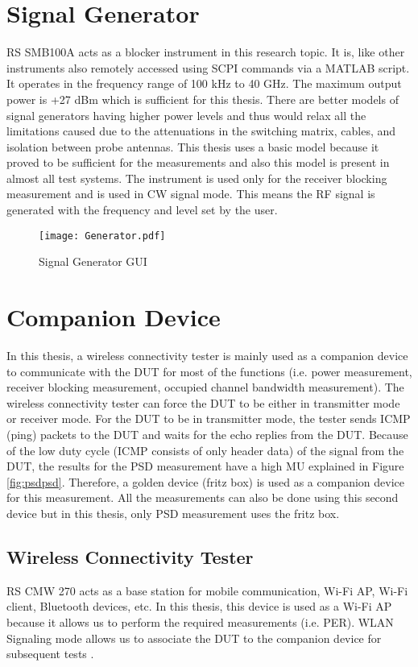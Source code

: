 \section{Signal Generator}
\acs{RS}\textregistered{} SMB100A acts as a blocker instrument in this research topic. It is, like other instruments also remotely accessed using \acs{SCPI} commands via a MATLAB\textregistered{} script. It operates in the frequency range of 100 kHz to 40 GHz. The maximum output power is +27 dBm which is sufficient for this thesis. There are better models of signal generators having higher power levels and thus would relax all the limitations caused due to the attenuations in the switching matrix, cables, and isolation between probe antennas. This thesis uses a basic model because it proved to be sufficient for the measurements and also this model is present in almost all test systems. The instrument is used only for the receiver blocking measurement and is used in \acs{CW} signal mode. This means the \acs{RF} signal is generated with the frequency and level set by the user.

\begin{figure}[H]
\centering
\texttt{[image: Generator.pdf]}
\caption{Signal Generator \acs{GUI} \cite{rssmb}}
\label{fig:gen}
\end{figure}

\section{Companion Device}
In this thesis, a wireless connectivity tester is mainly used as a companion device to communicate with the \acs{DUT} for most of the functions (i.e. power measurement, receiver blocking measurement, occupied channel bandwidth measurement). The wireless connectivity tester can force the \acs{DUT} to be either in transmitter mode or receiver mode. For the \acs{DUT} to be in transmitter mode, the tester sends \acf{ICMP} (ping) packets to the \acs{DUT} and waits for the echo replies from the \acs{DUT}. Because of the low duty cycle (\acs{ICMP} consists of only header data) of the signal from the \acs{DUT}, the results for the \acs{PSD} measurement have a high \ac{MU} explained in Figure \ref{fig:psdpsd}. Therefore, a golden device (fritz box) is used as a companion device for this measurement. All the measurements can also be done using this second device but in this thesis, only \ac{PSD} measurement uses the fritz box.

\subsection{Wireless Connectivity Tester} \label{sec:cmw}
\acs{RS}\textregistered{} CMW 270 acts as a base station for mobile communication, Wi-Fi\texttrademark{} \acs{AP}, Wi-Fi\texttrademark{} client, Bluetooth\textregistered{} devices, etc. In this thesis, this device is used as a Wi-Fi\texttrademark{} \acs{AP} because it allows us to perform the required measurements (i.e. \acf{PER}). \acs{WLAN} Signaling mode allows us to associate the \acs{DUT} to the companion device for subsequent tests \cite{cmw}.

